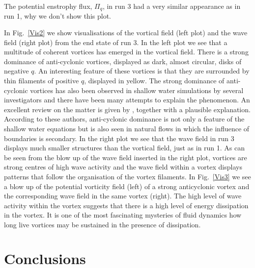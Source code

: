 The  potential enstrophy flux, $ \Pi_q $,  in run 3 had a very similar appearance as in run 1, why we don't show this plot. 



In Fig.~\ref{Vis2} we show visualisations of the vortical field (left plot) and the wave field (right plot) from the end state of run 3. In the left plot we see that a multitude of coherent vortices has emerged in the vortical field. There is a strong dominance of anti-cyclonic vortices, displayed as dark,  almost circular,  disks of negative $ q $. An interesting feature of these vortices is that they are surrounded by  thin filaments of positive $ q $, displayed in yellow. The strong dominance of anti-cyclonic vortices has also been observed in shallow water  simulations by several investigators  \citep{Cushman1990, Arai1994, Polvani1994, Cho1996} and there have been many attempts to explain the phenomenon. An excellent review on the matter is given by \citet{Graves2006}, together with a plausible explanation. According to these authors, anti-cyclonic dominance is not only a feature of the shallow water equations but is also seen in natural flows in which the influence of boundaries is secondary. In the right plot we see that the wave field in run 3 displays much smaller structures than the vortical field, just as in run 1.  As can be seen from the blow up of the wave field inserted in the right plot, vortices are strong centres of high wave activity and the wave field within a vortex displays patterns that follow the organisation of the vortex filaments.  In Fig.~\ref{Vis3} we see a blow up of the potential vorticity field (left) of a strong anticyclonic vortex and the corresponding wave field in the same vortex (right). The high level of wave activity within the vortex suggests that there is a high level of energy dissipation in the vortex.  It is one of the most fascinating mysteries of fluid dynamics how  long live vortices may be sustained in the presence of dissipation. 
 
 \section{Conclusions}

